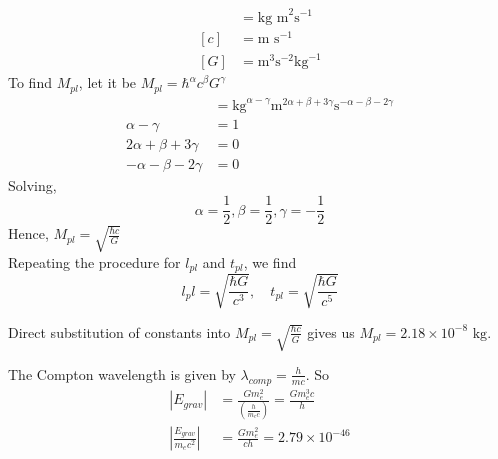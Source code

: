 \begin{solution}
    \begin{subsolution}
        \begin{align}
	[\hbar] &= \text{kg m}^2 \text{s}^{-1} \\
	[c] &= \text{m s}^{-1}\\
	[G] &= \text{m}^3 \text{s}^{-2} \text{kg}^{-1}
        \end{align}
        To find $M_{pl}$, let it be $M_{pl}=\hbar^\alpha c^\beta G^\gamma$
        \begin{align}
	   [M_{pl}] &= \text{kg}^{\alpha-\gamma} \text{m}^{2\alpha+\beta+3\gamma} \text{s}^{-\alpha-\beta-2\gamma} \\
	    \alpha-\gamma &= 1\\
	   2\alpha+\beta+3\gamma &= 0\\
	   -\alpha-\beta-2\gamma &=0
        \end{align}
        Solving, 
\[\alpha=\frac{1}{2}, \beta=\frac{1}{2}, \gamma=-\frac{1}{2}\]
        Hence, $M_{pl} = \sqrt{\frac{\hbar c}{G}}$\\
        Repeating the procedure for $l_{pl}$ and $t_{pl}$, we find
\[l_pl = \sqrt{\frac{\hbar G}{c^3}}, \quad t_{pl} = \sqrt{\frac{\hbar G}{c^5}}\]
    \end{subsolution}
    
    \begin{subsolution}
        Direct substitution of constants into $M_{pl} = \sqrt{\frac{\hbar c}{G}}$ gives us $M_{pl} = 2.18 \times 10^{-8} \text{ kg}$.
    \end{subsolution}
    
    \begin{subsolution}
        The Compton wavelength is given by $\lambda_{comp} = \frac{h}{mc}$. So
        \begin{align} 
	|E_{grav}| &= \frac{G m_e^2}{\left(\frac{h}{m_e c}\right) } = \frac{Gm_e^3 c}{h} \\
	\left|  \frac{E_{grav}}{m_e c^2} \right| &= \frac{Gm_e^2}{ch} = 2.79 \times 10^{-46}
\end{align}
    \end{subsolution}
\end{solution}

